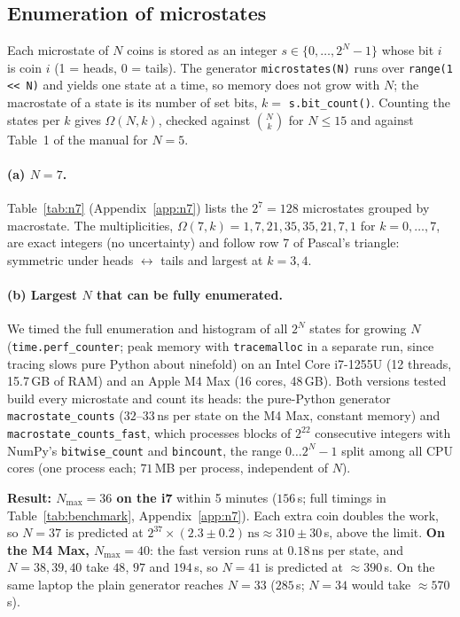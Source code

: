 \subsection{Enumeration of microstates}
Each microstate of $N$ coins is stored as an integer $s\in\{0,\dots,2^N-1\}$ whose bit $i$ is coin $i$ (1 = heads, 0 = tails). The generator \texttt{microstates(N)} runs over \texttt{range(1 << N)} and yields one state at a time, so memory does not grow with $N$; the macrostate of a state is its number of set bits, $k=$ \texttt{s.bit\_count()}. Counting the states per $k$ gives $\Omega(N,k)$, checked against $\binom{N}{k}$ for $N\le 15$ and against Table~1 of the manual for $N=5$.

\paragraph{(a) $N=7$.} Table~\ref{tab:n7} (Appendix~\ref{app:n7}) lists the $2^7=128$ microstates grouped by macrostate. The multiplicities, $\Omega(7,k)=1,7,21,35,35,21,7,1$ for $k=0,\dots,7$, are exact integers (no uncertainty) and follow row 7 of Pascal's triangle: symmetric under heads $\leftrightarrow$ tails and largest at $k=3,4$.

\paragraph{(b) Largest $N$ that can be fully enumerated.} We timed the full enumeration and histogram of all $2^N$ states for growing $N$ (\texttt{time.perf\_counter}; peak memory with \texttt{tracemalloc} in a separate run, since tracing slows pure Python about ninefold) on an Intel Core i7-1255U (12 threads, 15.7\,GB of RAM) and an Apple M4 Max (16 cores, 48\,GB). Both versions tested build every microstate and count its heads: the pure-Python generator \texttt{macrostate\_counts} ($32$--$33$\,ns per state on the M4 Max, constant memory) and \texttt{macrostate\_counts\_fast}, which processes blocks of $2^{22}$ consecutive integers with NumPy's \texttt{bitwise\_count} and \texttt{bincount}, the range $0\dots2^N-1$ split among all CPU cores (one process each; $71$\,MB per process, independent of $N$).

\textbf{Result: $N_{\max}=36$ on the i7} within 5 minutes ($156$\,s; full timings in Table~\ref{tab:benchmark}, Appendix~\ref{app:n7}). Each extra coin doubles the work, so $N=37$ is predicted at $2^{37}\times(2.3\pm0.2)\,\text{ns}\approx310\pm30$\,s, above the limit. \textbf{On the M4 Max, $N_{\max}=40$}: the fast version runs at $0.18$\,ns per state, and $N=38,39,40$ take $48$, $97$ and $194$\,s, so $N=41$ is predicted at $\approx390$\,s. On the same laptop the plain generator reaches $N=33$ ($285$\,s; $N=34$ would take $\approx570$\,s).

